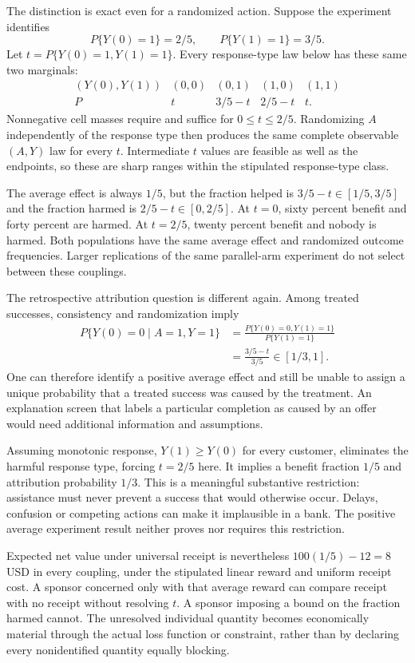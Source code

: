 The distinction is exact even for a randomized action. Suppose the
experiment identifies
\[
 P\{Y(0)=1\}=2/5,\qquad P\{Y(1)=1\}=3/5.
\]
Let $t=P\{Y(0)=1,Y(1)=1\}$. Every response-type law below has these
same two marginals:
\[
\begin{array}{c|cccc}
(Y(0),Y(1))&(0,0)&(0,1)&(1,0)&(1,1)\\ \hline
P&t&3/5-t&2/5-t&t .
\end{array}
\]
Nonnegative cell masses require and suffice for $0\le t\le2/5$.
Randomizing $A$ independently of the response type then produces
the same complete observable $(A,Y)$ law for every $t$.
Intermediate $t$ values are feasible as well as the endpoints,
so these are sharp ranges within the stipulated response-type
class.\citep{exec17_s3_exact}

The average effect is always $1/5$, but the fraction helped is
$3/5-t\in[1/5,3/5]$ and the fraction harmed is
$2/5-t\in[0,2/5]$. At $t=0$, sixty percent benefit and forty
percent are harmed. At $t=2/5$, twenty percent benefit and nobody
is harmed. Both populations have the same average effect and
randomized outcome frequencies. Larger replications of the same
parallel-arm experiment do not select between these couplings.

The retrospective attribution question is different again. Among
treated successes, consistency and randomization imply
\begin{align*}
 P\{Y(0)=0\mid A=1,Y=1\}
 &=\frac{P\{Y(0)=0,Y(1)=1\}}{P\{Y(1)=1\}}\\
 &=\frac{3/5-t}{3/5}\in[1/3,1].
\end{align*}
One can therefore identify a positive average effect and still be
unable to assign a unique probability that a treated success was
caused by the treatment. An explanation screen that labels a
particular completion as caused by an offer would need additional
information and assumptions.

Assuming monotonic response, $Y(1)\ge Y(0)$ for every customer,
eliminates the harmful response type, forcing $t=2/5$ here.
It implies a benefit fraction $1/5$ and attribution probability
$1/3$. This is a meaningful substantive restriction: assistance
must never prevent a success that would otherwise occur. Delays,
confusion or competing actions can make it implausible in a bank.
The positive average experiment result neither proves nor requires
this restriction.

Expected net value under universal receipt is nevertheless
$100(1/5)-12=8$ USD in every coupling, under the stipulated linear
reward and uniform receipt cost. A sponsor concerned only with
that average reward can compare receipt with no receipt without
resolving $t$. A sponsor imposing a bound on the fraction harmed
cannot. The unresolved individual quantity becomes economically
material through the actual loss function or constraint, rather
than by declaring every nonidentified quantity equally blocking.

